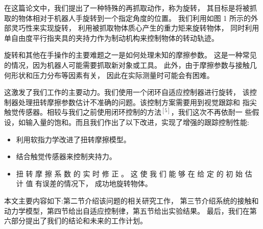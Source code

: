 在这篇论文中，我们提出了一种特殊的再抓取动作，称为旋转，
其目标是将被抓取的物体相对于机器人手旋转到一个指定角度的位置。
我们利用如图 1 所示的外部灵巧性来实现旋转，
利用被抓取物体质心产生的重力矩来旋转物体，
同时利用单自由度平行指夹具的夹持力作为制动机构来控制物体的转动轨迹。

旋转和其他在手操作的主要难题之一是如何处理未知的摩擦参数。
这是一种常见的情况，因为机器人可能需要抓取新对象或工具。
此外，由于摩擦参数与接触几何形状和压力分布等因素有关，
因此在实际测量时可能会有困难。

这激发了我们工作的主要动力。我们使用一个闭环自适应控制器进行旋转，
该控制器处理扭转摩擦参数估计不准确的问题。该控制方案需要用到视觉跟踪和
指尖触觉传感器。相较与我们之前使用闭环控制的方法$^{[5]}$，我们这次不再依耐一
些假设，如输入量的饱和。而且我们作出了以下改进，实现了增强的跟踪控制性能:

\begin{itemize}
  \item 利用软指力学改进了扭转摩擦模型。
  \item 结合触觉传感器来控制夹持力。
  \item 扭 转 摩 擦 系 数 的 实 时 修 正 。
				这 使 我 们 能 够 在 给 定 的 初 始 估 计 值 有误差的情况下，
				成功地旋转物体。
\end{itemize}


本文主要内容如下:第二节介绍该问题的相关研究工作，
第三节介绍系统的接触和动力学模型，第四节给出自适应控制律，第五节给出实验结果。
最后，我们在第六部分提出了我们的结论和未来的工作计划。


